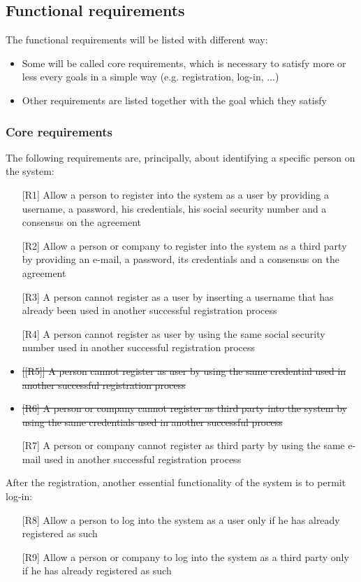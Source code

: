 \subsection{Functional requirements}
\par
The functional requirements will be listed with different way:
\begin{itemize}
\item Some will be called core requirements, which is necessary to satisfy more or less every goals in a simple way (e.g. registration, log-in, ...)
\item Other requirements are listed together with the goal which they satisfy
\end{itemize}

\subsubsection{Core requirements}
\par
The following requirements are, principally, about identifying a specific person on the system:
\begin{itemize}
\item[{[R1]}] Allow a person to register into the system as a user by providing a username, a password, his credentials, his social security number and a consensus on the agreement
\item[{[R2]}] Allow a person or company to register into the system as a third party by providing an e-mail, a password, its credentials and a consensus on the agreement
\item[{[R3]}] A person cannot register as a user by inserting a username that has already been used in another successful registration process
\item[{[R4]}] A person cannot register as user by using the same social security number used in another successful registration process 
\item \st{[{[R5]}] A person cannot register as user by using the same credential used in another successful registration process}
\item \st{[R6] A person or company cannot register as third party into the system by using the same credentials used in another successful process}
\item[{[R7]}] A person or company cannot register as third party by using the same e-mail used in another successful registration process
\end{itemize}
\par
After the registration, another essential functionality of the system is to permit log-in:
\begin{itemize}
\item[{[R8]}] Allow a person to log into the system as a user only if he has already registered as such
\item[{[R9]}] Allow a person or company to log into the system as a third party only if he has already registered as such
\end{itemize}

